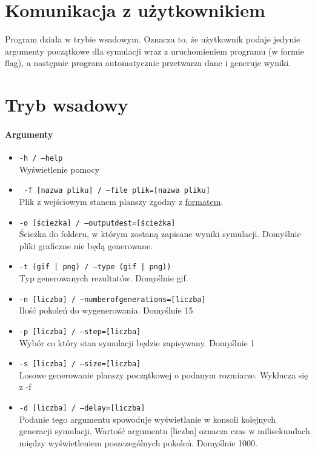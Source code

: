 \documentclass{report}
\begin{document}
\section{Komunikacja z użytkownikiem}
Program działa w trybie wsadowym. Oznacza to, że użytkownik podaje jedynie argumenty początkowe dla symulacji wraz z uruchomieniem programu (w formie flag), a następnie program automatycznie przetwarza dane i generuje wyniki.

\section{Tryb wsadowy}
\paragraph{Argumenty}
\begin{itemize}
\item \texttt{-h / --help} \\ Wyświetlenie pomocy
\item \texttt{ -f [nazwa pliku]  / --file plik=[nazwa pliku] } 
	\\ Plik z wejściowym stanem planszy zgodny z \hyperref[format]{\textcolor{LinkColor}{formatem}}.
\item \texttt{-o [ścieżka] / --output\textunderscore{}dest=[ścieżka]}  \\Ścieżka do folderu, w którym zostaną zapisane wyniki \label{output_dest} symulacji. Domyślnie pliki graficzne nie będą generowane.
\item \texttt{-t (gif | png) / --type (gif | png))} \\Typ generowanych rezultatów. Domyślnie gif. \label{output_args}
\item \texttt{-n [liczba] / --number\textunderscore{}of\textunderscore{}generations=[liczba]} \\ Ilość pokoleń do wygenerowania. Domyślnie 15
\item \texttt{-p [liczba] / --step=[liczba]} \\ Wybór co który stan symulacji będzie zapisywany. Domyślnie 1
\item \texttt{-s [liczba] / --size=[liczba]} \\ Losowe generowanie planszy początkowej o podanym rozmiarze. Wyklucza się z -f
\item \label{delay} \texttt{-d [liczba] / --delay=[liczba]} \\ Podanie tego argumentu spowoduje wyświetlanie w konsoli kolejnych generacji symulacji. Wartość argumentu [liczba] oznacza czas  w milisekundach między wyświetleniem poszczególnych pokoleń. Domyślnie 1000.
\end{itemize}
\end{document}
